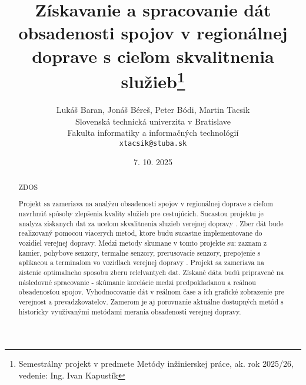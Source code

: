 \documentclass[10pt,twoside,slovak,a4paper]{article}
\title{Získavanie a spracovanie dát obsadenosti spojov v regionálnej doprave s cieľom skvalitnenia služieb\thanks{Semestrálny projekt v predmete Metódy inžinierskej práce, ak. rok 2025/26, vedenie: Ing. Ivan Kapustík}}
\author{Lukáš Baran,
Jonáš Béreš,
Peter Bódi,
Martin Tacsik\\[2pt]
	{\small Slovenská technická univerzita v Bratislave}\\
	{\small Fakulta informatiky a informačných technológií}\\
	{\small \texttt{xtacsik@stuba.sk}}
	}
\date{\small 7. 10. 2025}
\begin{document}
\maketitle



\begin{abstract}
ZDOS


Projekt sa zameriava na analýzu obsadenosti spojov v regionálnej doprave s cieľom navrhnúť spôsoby zlepšenia kvality služieb pre cestujúcich. Sucastou projektu je analyza ziskanych dat za ucelom skvalitnenia sluzieb verejnej dopravy . Zber dát bude realizovaný pomocou viacerych metod,  ktore budu sucastne implementovane do vozidiel verejnej dopravy. Medzi metody skumane v tomto projekte su: zaznam z kamier, pohybove senzory, termalne senzory, prerusovacie senzory,   prepojenie s aplikacou a terminalom vo vozidlach verejnej dopravy . Projekt sa zameriava na zistenie optimalneho sposobu zberu relelvantych dat. Získané dáta budú pripravené na následovné spracovanie - skúmanie korelácie medzi predpokladanou a reálnou obsadenosťou spojov. Vyhodnocovanie dát v reálnom čase a ich grafické zobrazenie pre verejnost a prevadzkovatelov. Zamerom je aj porovnanie aktuálne dostupných metód s historicky využívanými metódami merania obsadenosti verejnej dopravy.

\end{abstract}
\end{document}
